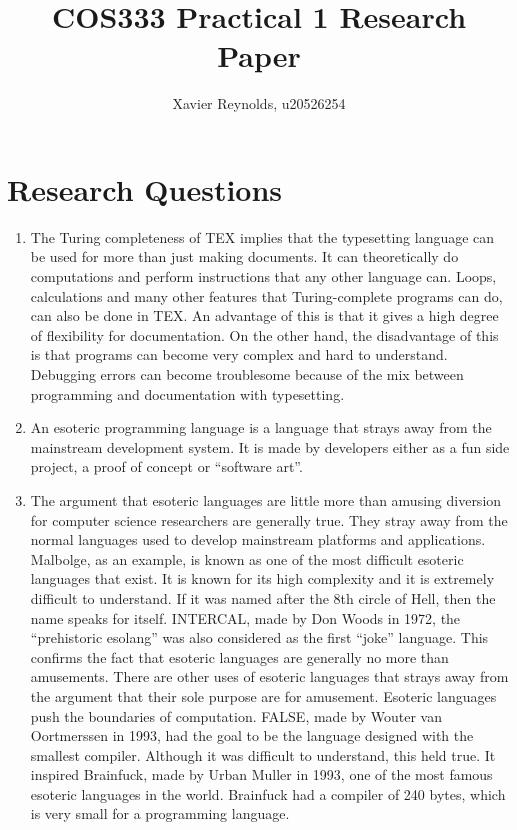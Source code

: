 \documentclass{article}
\title{COS333 Practical 1 Research Paper}
\author{Xavier Reynolds, u20526254}
\begin{document}
\date{}
\maketitle

\section*{Research Questions}

\begin{enumerate}
    \item The Turing completeness of TEX implies that the typesetting language can be used for more than just making documents. It can theoretically do computations and perform instructions that any other language can. 
    Loops, calculations and many other features that Turing-complete programs can do, can also be done in TEX. An advantage of this is that it gives a high degree of flexibility for documentation. 
    On the other hand, the disadvantage of this is that  programs can become very complex and hard to understand. Debugging errors can become troublesome because of the mix between programming and documentation with typesetting. \cite{tex_wiki}
    
    \item An esoteric programming language is a language that strays away from the mainstream development system. It is made by developers either as a fun side project, a proof of concept or “software art”. \cite{eso_wiki}
    
    \item The argument that esoteric languages are little more than amusing diversion for computer science researchers are generally true. They stray away from the normal languages used to develop mainstream platforms and applications. Malbolge, as an example, is known as one of the most difficult esoteric languages that exist. It is known for its high complexity and it is extremely difficult to understand. If it was named after the 8th circle of Hell, then the name speaks for itself. INTERCAL, made by Don Woods in 1972, the “prehistoric esolang” was also considered as the first “joke” language. This confirms the fact that esoteric languages are generally no more than amusements.
    There are other uses of esoteric languages that strays away from the argument that their sole purpose are for amusement. Esoteric languages push the boundaries of computation. FALSE, made by Wouter van Oortmerssen in 1993, had the goal to be the language designed with the smallest compiler. Although it was difficult to understand, this held true. It inspired Brainfuck, made by Urban Muller in 1993, one of the most famous esoteric languages in the world. Brainfuck had a compiler of 240 bytes, which is very small for a programming language. \cite{intercal} \cite{eso_malbolge} \cite{wiki_malbolge} \cite{false}
    

\end{enumerate}
\end{document}

